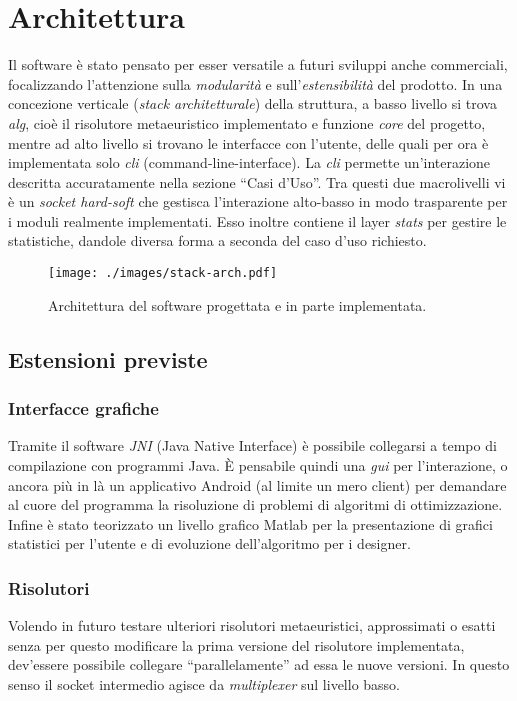 \section{Architettura}
	Il software è stato pensato per esser versatile a futuri sviluppi anche commerciali, focalizzando l'attenzione sulla
	\emph{modularità} e sull'\emph{estensibilità} del prodotto. In una concezione verticale (\emph{stack architetturale})
	della struttura, a basso livello si trova \emph{alg}, cioè il risolutore metaeuristico implementato e funzione \emph{core}
	del progetto, mentre ad alto livello si trovano le interfacce con l'utente, delle quali per ora è implementata solo \emph{cli}
	(command-line-interface). La \emph{cli} permette un'interazione descritta accuratamente nella sezione ``Casi d'Uso''.
	Tra questi due macrolivelli vi è un \emph{socket hard-soft} che gestisca l'interazione alto-basso in modo trasparente per i 
	moduli realmente implementati. Esso inoltre contiene il layer \emph{stats} per gestire le statistiche, dandole diversa forma
	a seconda del caso d'uso richiesto.
	\begin{figure}[H] 
	 	\begin{center}\texttt{[image: ./images/stack-arch.pdf]}
	 	\end{center} \caption{Architettura del software progettata
	e in parte implementata.} \label{fig:stackArch}
 	\end{figure}
	\subsection{Estensioni previste}
	\subsubsection{Interfacce grafiche}
	Tramite il software \emph{JNI} (Java Native Interface) è possibile collegarsi a tempo di compilazione con programmi Java.
	È pensabile quindi una \emph{gui} per l'interazione, o ancora più in là un applicativo Android (al limite un mero client)
	per demandare al cuore del programma la risoluzione di problemi di algoritmi di ottimizzazione.
	Infine è stato teorizzato un livello grafico Matlab per la presentazione di grafici statistici per l'utente e di evoluzione
	dell'algoritmo per i designer. 
	\subsubsection{Risolutori}
	Volendo in futuro testare ulteriori risolutori metaeuristici, approssimati o esatti senza per questo modificare la prima versione 
	del risolutore implementata, dev'essere possibile collegare ``parallelamente'' ad essa le nuove versioni. In questo senso il socket
	intermedio agisce da \emph{multiplexer} sul livello basso.

